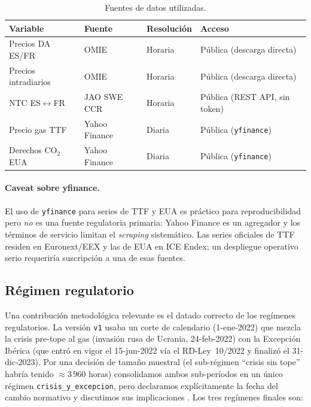 \documentclass[11pt,a4paper]{article}
\begin{document}
\begin{table}[H]
\centering
\small
\caption{Fuentes de datos utilizadas.}
\label{tab:fuentes}
\begin{tabularx}{\linewidth}{lXll}
\toprule
\textbf{Variable} & \textbf{Fuente} & \textbf{Resolución} & \textbf{Acceso} \\
\midrule
Precios DA ES/FR        & OMIE                & Horaria & Pública (descarga directa) \\
Precios intradiarios    & OMIE                & Horaria & Pública (descarga directa) \\
NTC ES$\leftrightarrow$FR & JAO SWE CCR        & Horaria & Pública (REST API, sin token) \\
Precio gas TTF          & Yahoo Finance       & Diaria  & Pública (\texttt{yfinance}) \\
Derechos CO$_2$ EUA     & Yahoo Finance       & Diaria  & Pública (\texttt{yfinance}) \\
\bottomrule
\end{tabularx}
\end{table}

\paragraph{Caveat sobre yfinance.} El uso de \texttt{yfinance} para series
de TTF y EUA es práctico para reproducibilidad pero \emph{no} es una
fuente regulatoria primaria: Yahoo Finance es un agregador y los términos
de servicio limitan el \emph{scraping} sistemático. Las series oficiales
de TTF residen en Euronext/EEX y las de EUA en ICE Endex; un despliegue
operativo serio requeriría suscripción a una de esas fuentes.

\subsection{Régimen regulatorio}

Una contribución metodológica relevante es el datado correcto de los
regímenes regulatorios. La versión \texttt{v1} usaba un corte de
calendario (1-ene-2022) que mezcla la crisis pre-tope al gas
(invasión rusa de Ucrania, 24-feb-2022) con la Excepción Ibérica (que
entró en vigor el 15-jun-2022 vía el RD-Ley~10/2022 y finalizó el
31-dic-2023). Por una decisión de tamaño muestral (el sub-régimen
``crisis sin tope'' habría tenido $\approx 3\,960$ horas) consolidamos
ambos sub-períodos en un único régimen \texttt{crisis\_y\_excepcion}, pero
declaramos explícitamente la fecha del cambio normativo y discutimos sus
implicaciones \citep{Fabra2023}. Los tres regímenes finales son:
\end{document}
